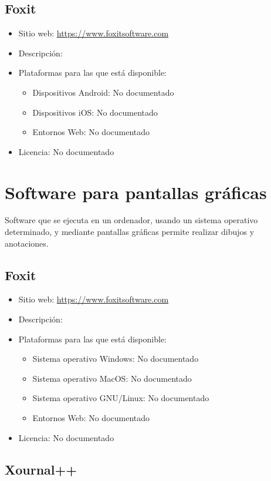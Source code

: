 \documentclass[11pt]{article}
\newcommand{\nodoc}{No documentado}
\begin{document}
\subsection{Foxit}

\begin{itemize}
\item Sitio web: \url{https://www.foxitsoftware.com}
\item Descripción:
\item Plataformas para las que está disponible:
  \begin{itemize}
  \item Dispositivos Android: \nodoc
  \item Dispositivos iOS: \nodoc
  \item Entornos Web: \nodoc
  \end{itemize}
\item Licencia: \nodoc
\end{itemize}

\section{Software para pantallas gráficas}

Software que se ejecuta en un ordenador, usando un sistema operativo
determinado, y mediante pantallas gráficas permite realizar dibujos y
anotaciones.

\subsection{Foxit}

\begin{itemize}
\item Sitio web: \url{https://www.foxitsoftware.com}
\item Descripción:
\item Plataformas para las que está disponible:
  \begin{itemize}
  \item Sistema operativo Windows: \nodoc
  \item Sistema operativo MacOS: \nodoc
  \item Sistema operativo GNU/Linux: \nodoc
  \item Entornos Web: \nodoc
  \end{itemize}
\item Licencia: \nodoc
\end{itemize}


\subsection{Xournal++}
\end{document}
